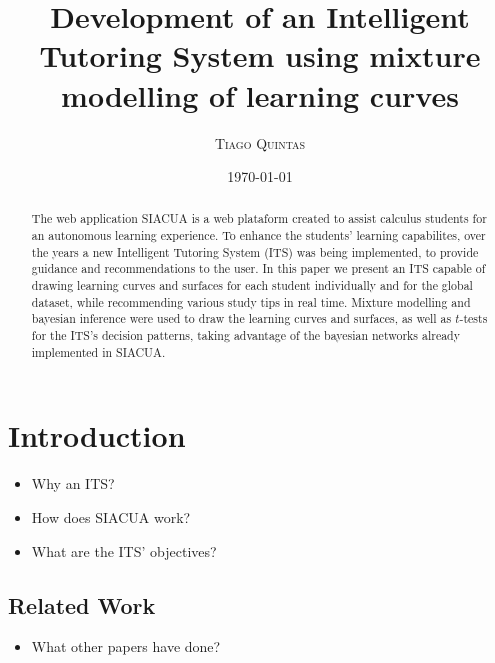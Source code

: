 \documentclass{article}
\title{
\textbf{\huge{Development of an Intelligent Tutoring System using mixture modelling of learning curves}}
}
\author{\Large{\textsc{Tiago Quintas}}}
\date{\today}
\newcommand{\0}{\mathbbold{0}}
\newcommand{\1}{\mathds{1}}
\begin{document}
\maketitle
\begin{abstract}
    The web application SIACUA is a web plataform created to assist calculus students for an autonomous learning experience.
    To enhance the students' learning capabilites, over the years a new Intelligent Tutoring System (ITS) was being implemented, to provide guidance and recommendations to the user.
    In this paper we present an ITS capable of drawing learning curves and surfaces for each student individually and for the global dataset, while recommending various study tips in real time.
    Mixture modelling and bayesian inference were used to draw the learning curves and surfaces, as well as $t$-tests for the ITS's decision patterns, taking advantage of the bayesian networks already implemented in SIACUA.
\end{abstract}
\section{Introduction}
\begin{itemize}
    \item Why an ITS?
    \item How does SIACUA work?
    \item What are the ITS' objectives?
\end{itemize}
\subsection{Related Work}
\begin{itemize}
    \item What other papers have done?
\end{itemize}
\end{document}

